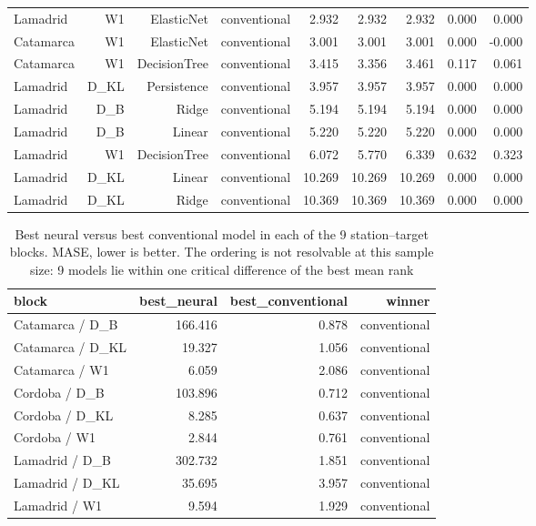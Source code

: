 \begin{table}[t]
\begin{tabular}{lrrrrrrrr}
Lamadrid & W1 & ElasticNet & conventional & 2.932 & 2.932 & 2.932 & 0.000 & 0.000 \\
Catamarca & W1 & ElasticNet & conventional & 3.001 & 3.001 & 3.001 & 0.000 & -0.000 \\
Catamarca & W1 & DecisionTree & conventional & 3.415 & 3.356 & 3.461 & 0.117 & 0.061 \\
Lamadrid & D\_KL & Persistence & conventional & 3.957 & 3.957 & 3.957 & 0.000 & 0.000 \\
Lamadrid & D\_B & Ridge & conventional & 5.194 & 5.194 & 5.194 & 0.000 & 0.000 \\
Lamadrid & D\_B & Linear & conventional & 5.220 & 5.220 & 5.220 & 0.000 & 0.000 \\
Lamadrid & W1 & DecisionTree & conventional & 6.072 & 5.770 & 6.339 & 0.632 & 0.323 \\
Lamadrid & D\_KL & Linear & conventional & 10.269 & 10.269 & 10.269 & 0.000 & 0.000 \\
Lamadrid & D\_KL & Ridge & conventional & 10.369 & 10.369 & 10.369 & 0.000 & 0.000 \\
\bottomrule
\end{tabular}
\end{table}

\begin{table}[t]
\centering
\caption{Best neural versus best conventional model in each of the 9 station--target blocks. MASE, lower is better. The ordering is not resolvable at this sample size: 9 models lie within one critical difference of the best mean rank}
\label{tab:winloss}
\begin{tabular}{lrrr}
\toprule
block & best\_neural & best\_conventional & winner \\
\midrule
Catamarca / D\_B & 166.416 & 0.878 & conventional \\
Catamarca / D\_KL & 19.327 & 1.056 & conventional \\
Catamarca / W1 & 6.059 & 2.086 & conventional \\
Cordoba / D\_B & 103.896 & 0.712 & conventional \\
Cordoba / D\_KL & 8.285 & 0.637 & conventional \\
Cordoba / W1 & 2.844 & 0.761 & conventional \\
Lamadrid / D\_B & 302.732 & 1.851 & conventional \\
Lamadrid / D\_KL & 35.695 & 3.957 & conventional \\
Lamadrid / W1 & 9.594 & 1.929 & conventional \\
\bottomrule
\end{tabular}
\end{table}

